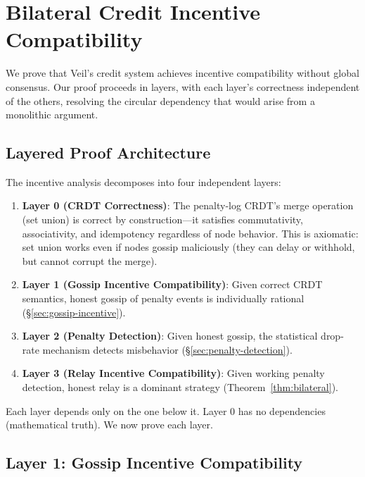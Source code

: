 \documentclass[11pt,a4paper]{article}
\begin{document}

\section{Bilateral Credit Incentive Compatibility}
\label{sec:incentive-theorem}

We prove that Veil's credit system achieves incentive compatibility without global consensus. Our proof proceeds in layers, with each layer's correctness independent of the others, resolving the circular dependency that would arise from a monolithic argument.

\subsection{Layered Proof Architecture}

The incentive analysis decomposes into four independent layers:

\begin{enumerate}
    \item \textbf{Layer 0 (CRDT Correctness)}: The penalty-log CRDT's merge operation (set union) is correct by construction---it satisfies commutativity, associativity, and idempotency regardless of node behavior. This is axiomatic: set union works even if nodes gossip maliciously (they can delay or withhold, but cannot corrupt the merge).

    \item \textbf{Layer 1 (Gossip Incentive Compatibility)}: Given correct CRDT semantics, honest gossip of penalty events is individually rational (\S\ref{sec:gossip-incentive}).

    \item \textbf{Layer 2 (Penalty Detection)}: Given honest gossip, the statistical drop-rate mechanism detects misbehavior (\S\ref{sec:penalty-detection}).

    \item \textbf{Layer 3 (Relay Incentive Compatibility)}: Given working penalty detection, honest relay is a dominant strategy (Theorem~\ref{thm:bilateral}).
\end{enumerate}

Each layer depends only on the one below it. Layer 0 has no dependencies (mathematical truth). We now prove each layer.

\subsection{Layer 1: Gossip Incentive Compatibility}
\end{document}
